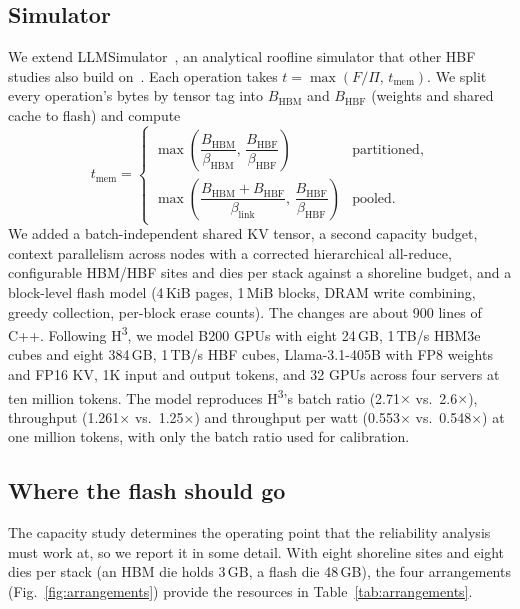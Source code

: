 \documentclass[conference,10pt]{IEEEtran}
\newcommand{\Hthree}{H\textsuperscript{3}}
\begin{document}
\subsection{Simulator}
We extend LLMSimulator~\cite{yun2024duplex}, an analytical roofline simulator
that other HBF studies also build on~\cite{son2026exploring,kyung2026hbfkv,kim2026dash}.
Each operation takes $t=\max(F/\Pi,\,t_{\mathrm{mem}})$. We split every
operation's bytes by tensor tag into $B_{\mathrm{HBM}}$ and $B_{\mathrm{HBF}}$
(weights and shared cache to flash) and compute
\begin{equation}
t_{\mathrm{mem}} =
\begin{cases}
\max\!\left(\dfrac{B_{\mathrm{HBM}}}{\beta_{\mathrm{HBM}}},\,
            \dfrac{B_{\mathrm{HBF}}}{\beta_{\mathrm{HBF}}}\right)
  & \text{partitioned,}\\[10pt]
\max\!\left(\dfrac{B_{\mathrm{HBM}}+B_{\mathrm{HBF}}}{\beta_{\mathrm{link}}},\,
            \dfrac{B_{\mathrm{HBF}}}{\beta_{\mathrm{HBF}}}\right)
  & \text{pooled.}
\end{cases}
\label{eq:tmem}
\end{equation}
We added a batch-independent shared KV tensor, a second capacity budget,
context parallelism across nodes with a corrected hierarchical all-reduce,
configurable HBM/HBF sites and dies per stack against a shoreline budget, and a
block-level flash model (4\,KiB pages, 1\,MiB blocks, DRAM write combining,
greedy collection, per-block erase counts). The changes are about 900 lines of
C++. Following \Hthree{}, we model B200 GPUs with eight 24\,GB, 1\,TB/s HBM3e cubes
and eight 384\,GB, 1\,TB/s HBF cubes, Llama-3.1-405B with FP8 weights and FP16 KV,
1K input and output tokens, and 32 GPUs across four servers at ten million
tokens. The model reproduces \Hthree{}'s batch ratio (2.71$\times$ vs.\ 2.6$\times$),
throughput (1.261$\times$ vs.\ 1.25$\times$) and throughput per watt
(0.553$\times$ vs.\ 0.548$\times$) at one million tokens, with only the batch
ratio used for calibration.

\subsection{Where the flash should go}
The capacity study determines the operating point that the reliability analysis
must work at, so we report it in some detail. With eight shoreline sites and
eight dies per stack (an HBM die holds 3\,GB, a flash die 48\,GB), the four
arrangements (Fig.~\ref{fig:arrangements}) provide the resources in
Table~\ref{tab:arrangements}.
\end{document}
